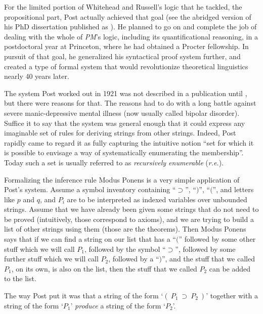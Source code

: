 \documentclass[output=paper]{langscibook}
\begin{document}
For the limited portion of  Whitehead and Russell's logic that he tackled, the propositional part, Post actually achieved that goal (see the abridged version of his PhD dissertation published as \citealt{Post21}). He planned to go on and complete the job of dealing with the whole of \textit{PM}'s logic, including its quantificational reasoning, in a postdoctoral year at Princeton, where he had obtained a Procter fellowship. In pursuit of that goal, he generalized his syntactical proof system further, and created a type of formal system that would revolutionize theoretical linguistics nearly 40 years later.

The system Post worked out in 1921 was not described in a publication until \citeyear{Post43}, but there were reasons for that. The reasons had to do with a long battle against severe manic-depressive mental illness (now usually called bipolar disorder). Suffice it to say that the system was general enough that it could express any imaginable set of rules for deriving strings from other strings. Indeed, Post rapidly came to regard it as fully capturing the intuitive notion ``set for which it is possible to envisage a way of systematically enumerating the membership''. Today such a set is usually referred to as \emph{recursively enumerable} (\emph{r.e.}).

Formalizing the inference rule Modus Ponens is a very simple application of Post's system. Assume a symbol inventory containing ``$\supset$'', ``$)$'', ``$($'', and letters like $p$ and $q$, and $P_i$ are to be interpreted as indexed variables over unbounded strings.  Assume that we have already been given some strings that do not need to be proved (intuitively, those correspond to axioms), and we are trying to build a list of other strings using them (those are the theorems).  Then Modus Ponens says that if we can find a string on our list that has a ``$($'' followed by some other stuff which we will call $P_1$, followed by the symbol ``$\supset$'', followed by some further stuff which we will call $P_2$, followed by a ``$)$'', and the stuff that we called $P_1$, on its own, is also on the list, then the stuff that we called $P_2$ can be added to the list.

The way Post put it was that a string of the form `$(\:P_1\:\supset\:P_2\:)$' together with a string of the form `$P_1$' \emph{produce} a string of the form `$P_2$'.
\end{document}
